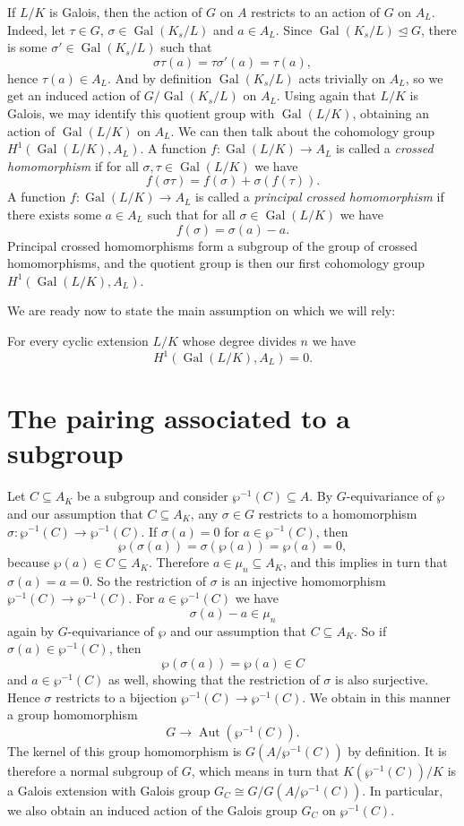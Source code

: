 \documentclass[12pt]{amsart}
\DeclareMathOperator{\Gal}{Gal}
\DeclareMathOperator{\Aut}{Aut}
\begin{document}
If $L/K$ is Galois, then the action of $G$ on $A$ restricts to an action of $G$ on $A_{L}$.
Indeed, let $\tau\in G$, $\sigma\in \Gal(K_{s}/L)$ and $a\in A_{L}$.
Since $\Gal(K_{s}/L)\trianglelefteq G$, there is some $\sigma'\in \Gal(K_{s}/L)$ such that
\[ \sigma\tau(a)=\tau\sigma'(a)=\tau(a), \]
hence $\tau(a)\in A_{L}$.
And by definition $\Gal(K_{s}/L)$ acts trivially on $A_{L}$, so we get an induced action of $G/\Gal(K_{s}/L)$ on $A_{L}$.
Using again that $L/K$ is Galois, we may identify this quotient group with $\Gal(L/K)$, obtaining an action of $\Gal(L/K)$ on $A_{L}$.
We can then talk about the cohomology group $H^{1}(\Gal(L/K),A_{L})$.
A function $f\colon \Gal(L/K)\to A_{L}$ is called a \textit{crossed homomorphism} if for all $\sigma,\tau\in \Gal(L/K)$ we have
\[ f(\sigma\tau)=f(\sigma)+\sigma (f(\tau)). \]
A function $f\colon \Gal(L/K)\to A_{L}$ is called a \textit{principal crossed homomorphism} if there exists some $a\in A_{L}$ such that for all $\sigma \in \Gal(L/K)$ we have
\[ f(\sigma)=\sigma(a)-a. \]
Principal crossed homomorphisms form a subgroup of the group of crossed homomorphisms, and the quotient group is then our first cohomology group $H^{1}(\Gal(L/K),A_{L})$.

We are ready now to state the main assumption on which we will rely:

\begin{axiom}\label{axiom}
    For every cyclic extension $L/K$ whose degree divides $n$ we have
    \[ H^{1}(\Gal(L/K),A_{L})=0. \]
\end{axiom}

\section{The pairing associated to a subgroup}

Let $C\subseteq A_{K}$ be a subgroup and consider $\wp^{-1}(C)\subseteq A$.
By $G$-equivariance of $\wp$ and our assumption that $C\subseteq A_{K}$, any $\sigma\in G$ restricts to a homomorphism $\sigma\colon \wp^{-1}(C)\to \wp^{-1}(C)$.
If $\sigma(a)=0$ for $a\in \wp^{-1}(C)$, then
\[ \wp(\sigma(a))=\sigma(\wp(a))=\wp(a)=0, \]
because $\wp(a)\in C\subseteq A_{K}$.
Therefore $a\in \mu_{n}\subseteq A_{K}$, and this implies in turn that $\sigma(a)=a=0$.
So the restriction of $\sigma$ is an injective homomorphism $\wp^{-1}(C)\to \wp^{-1}(C)$.
For $a\in \wp^{-1}(C)$ we have
\[ \sigma(a)-a\in \mu_{n} \]
again by $G$-equivariance of $\wp$ and our assumption that $C\subseteq A_{K}$.
So if $\sigma(a)\in \wp^{-1}(C)$, then
\[ \wp(\sigma(a))=\wp(a)\in C \]
and $a\in \wp^{-1}(C)$ as well, showing that the restriction of $\sigma$ is also surjective.
Hence $\sigma$ restricts to a bijection $\wp^{-1}(C)\to \wp^{-1}(C)$.
We obtain in this manner a group homomorphism
\[ G\to \Aut(\wp^{-1}(C)). \]
The kernel of this group homomorphism is $G(A/\wp^{-1}(C))$ by definition.
It is therefore a normal subgroup of $G$, which means in turn that $K(\wp^{-1}(C))/K$ is a Galois extension with Galois group $G_{C}\cong G/G(A/\wp^{-1}(C))$.
In particular, we also obtain an induced action of the Galois group $G_{C}$ on $\wp^{-1}(C)$.
\end{document}
